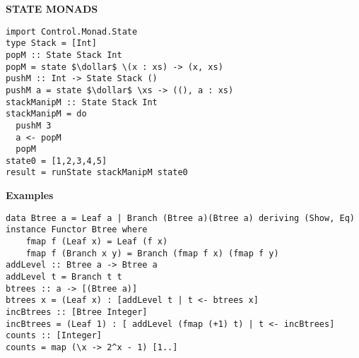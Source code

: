 \documentclass{article}
\newcommand{\dollar}{\mbox{\textdollar}}
\begin{document}
\begin{multicols*}{4}
\hrulefill

\textbf{STATE MONADS}
\begin{lstlisting}
import Control.Monad.State
type Stack = [Int]
popM :: State Stack Int
popM = state $\dollar$ \(x : xs) -> (x, xs)
pushM :: Int -> State Stack ()
pushM a = state $\dollar$ \xs -> ((), a : xs)
stackManipM :: State Stack Int
stackManipM = do
  pushM 3
  a <- popM
  popM
state0 = [1,2,3,4,5]
result = runState stackManipM state0
\end{lstlisting}

\hrulefill

\textbf{Examples}
\begin{lstlisting}
data Btree a = Leaf a | Branch (Btree a)(Btree a) deriving (Show, Eq)
instance Functor Btree where
    fmap f (Leaf x) = Leaf (f x)
    fmap f (Branch x y) = Branch (fmap f x) (fmap f y)
addLevel :: Btree a -> Btree a
addLevel t = Branch t t
btrees :: a -> [(Btree a)]
btrees x = (Leaf x) : [addLevel t | t <- btrees x]
incBtrees :: [Btree Integer]
incBtrees = (Leaf 1) : [ addLevel (fmap (+1) t) | t <- incBtrees]
counts :: [Integer]
counts = map (\x -> 2^x - 1) [1..]
\end{lstlisting}
\hrulefill
\begin{lstlisting}

\end{lstlisting}

\end{multicols*}
\end{document}
